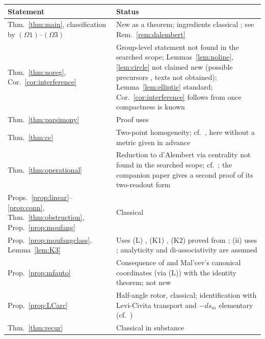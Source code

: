 \documentclass[11pt,reqno]{amsart}
\theoremstyle{definition}
\theoremstyle{remark}
\numberwithin{equation}{section}
\begin{document}
\begin{center}
\small
\begin{tabular}{@{}p{}p{}@{}}
\toprule
Statement & Status\\
\midrule
Thm.~\ref{thm:main}, classification by $(\Omega1)$--$(\Omega3)$ & New as a theorem; ingredients classical \cite{Certaine,Gleason52,MZ,Milnor,Knapp}; see Rem.~\ref{rem:dalembert}\\
Thm.~\ref{thm:noreg}, Cor.~\ref{cor:interference} & Group-level statement not found in the searched scope; Lemmas~\ref{lem:noline}, \ref{lem:circle} not claimed new (possible precursors \cite{Kuczma64,Sharkovskii73}, texts not obtained); Lemma~\ref{lem:elliptic} standard; Cor.~\ref{cor:interference} follows from \cite{Davison08} once compactness is known\\
Thm.~\ref{thm:parsimony} & Proof uses \cite{PW,Folland}\\
Thm.~\ref{thm:cc} & Two-point homogeneity; cf.\ \cite{Wang52,Tits55}, here without a metric given in advance\\
Thm.~\ref{thm:operational} & Reduction to d'Alembert via centrality not found in the searched scope; cf.\ \cite{Stetkaer,Stetkaer98,CENSZ95,Davison08}; the companion paper \cite{Companion} gives a second proof of its two-readout form\\
Props.~\ref{prop:linear}--\ref{prop:conn}, Thm.~\ref{thm:obstruction}, Prop.~\ref{prop:moufang} & Classical \cite{CS,Loos,CE,Adams}\\
Prop.~\ref{prop:moufangclass}, Lemma~\ref{lem:K3} & Uses (L) \cite{Malcev55}, (K1) \cite{Grishkov80}, (K2) proved from \cite{Sagle62,Kuzmin68,Filippov76,Loginov01}; (ii) uses \cite{Kerdman}; analyticity and di-associativity are assumed\\
Prop.~\ref{prop:mfauto} & Consequence of \cite[Thm.~1]{Kuzmin71} and Mal'cev's canonical coordinates \cite{Malcev55} (via (L)) with the identity theorem; not new\\
Prop.~\ref{prop:LCarc} & Half-angle rotor, classical; identification with Levi-Civita transport and $-ds_m$ elementary (cf.\ \cite{Helgason})\\
Thm.~\ref{thm:recur} & Classical in substance \cite{Loos,MH}\\
\bottomrule
\end{tabular}
\end{center}
\end{document}
